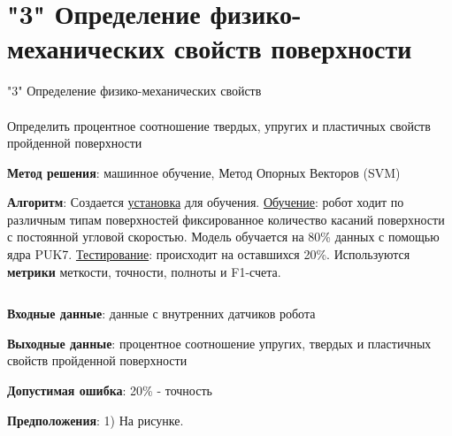 \section{"3" Определение физико-механических свойств поверхности}

\begin{frame}[t]{"3" Определение физико-механических свойств}
    \framesubtitle{}
    \small
    Определить процентное соотношение твердых, упругих и пластичных свойств пройденной поверхности

    \textbf{Метод решения}: машинное обучение, Метод Опорных Векторов (SVM)

    \textbf{Алгоритм}: Создается \underline{установка} для обучения. \underline{Обучение}: робот ходит по различным типам поверхностей фиксированное количество касаний поверхности с постоянной угловой скоростью. Модель обучается на 80\% данных с помощью ядра PUK7. \underline{Тестирование}: происходит на оставшихся 20\%.  Используются \textbf{метрики} меткости, точности, полноты и F1-счета.

    \begin{columns}[T,onlytextwidth]
        \begin{column}{0.44\textwidth}
            \textbf{Входные данные}: данные с внутренних датчиков робота

            \textbf{Выходные данные}: процентное соотношение упругих, твердых и пластичных свойств пройденной поверхности

            \textbf{Допустимая ошибка}: 20\% - точность

            \textbf{Предположения}: 1) На рисунке.

        \end{column}
        \begin{column}{0.54\textwidth}
            

\end{column}
\end{columns}
\end{frame}
